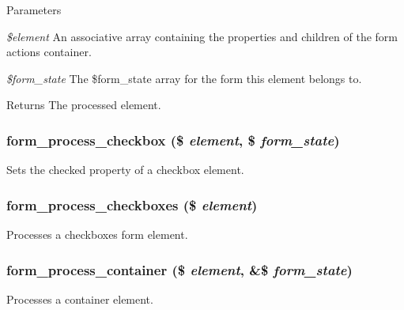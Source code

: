 \begin{DoxyParams}{Parameters}
\item[{\em \$element}]An associative array containing the properties and children of the form actions container. \item[{\em \$form\_\-state}]The \$form\_\-state array for the form this element belongs to.\end{DoxyParams}
\begin{DoxyReturn}{Returns}
The processed element. 
\end{DoxyReturn}
\hypertarget{group__form__api_gab1a1b30f07888d0fa0de8b8222ee7994}{
\subsubsection[{form\_\-process\_\-checkbox}]{\setlength{\rightskip}{0pt plus 5cm}form\_\-process\_\-checkbox (\$ {\em element}, \/  \$ {\em form\_\-state})}}
\label{group__form__api_gab1a1b30f07888d0fa0de8b8222ee7994}
Sets the checked property of a checkbox element. \hypertarget{group__form__api_ga916a0224fe0771749af2c05dfdb13df1}{
\subsubsection[{form\_\-process\_\-checkboxes}]{\setlength{\rightskip}{0pt plus 5cm}form\_\-process\_\-checkboxes (\$ {\em element})}}
\label{group__form__api_ga916a0224fe0771749af2c05dfdb13df1}
Processes a checkboxes form element. \hypertarget{group__form__api_ga8a121eab47e8d864fcc62f8d8443f501}{
\subsubsection[{form\_\-process\_\-container}]{\setlength{\rightskip}{0pt plus 5cm}form\_\-process\_\-container (\$ {\em element}, \/  \&\$ {\em form\_\-state})}}
\label{group__form__api_ga8a121eab47e8d864fcc62f8d8443f501}
Processes a container element.


